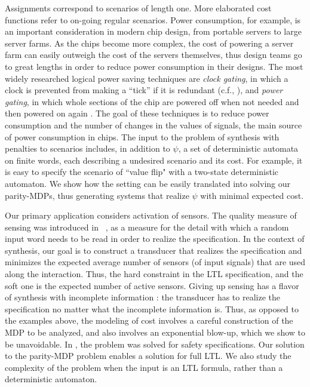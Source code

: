 \documentclass[runningheads,a4paper]{llncs}
\begin{document}
Assignments correspond to scenarios of length one. More elaborated cost functions refer to on-going regular scenarios. 
Power consumption, for example, is an important consideration in modern chip design, from portable servers
to large server farms. As the chips become more complex, the cost of powering a server
farm can easily outweigh the cost of the servers themselves, thus design teams go to great
lengths in order to reduce power consumption in their designs.
The most widely researched logical power saving techniques are \emph{clock gating}, in which a clock is prevented from making a ``tick'' if it is redundant (c.f., \cite{ARY09}), and \emph{power gating}, in which whole sections of the chip are powered off when not needed and then powered on again \cite{KFAGS07,ENY09}. The goal of these techniques is to reduce power consumption and the number of changes in the values of signals, the main source of power consumption in chips. 
The input to the problem of synthesis with penalties to scenarios includes, in addition to $\psi$, a set of deterministic automata on finite words, each describing a undesired scenario and its cost. For example, it is easy to specify the scenario of ``value flip" with a two-state deterministic automaton.
We show how the setting can be easily translated into solving our parity-MDPs, thus generating systems that realize $\psi$ with minimal expected cost. 


Our primary application considers activation of sensors. The quality measure of sensing was introduced in ~\cite{AKK14,AKK15}, as a measure for the detail with which a random input word needs to be read in order to realize the specification. In the context of synthesis, our goal is to construct a transducer that realizes the specification and minimizes the expected average number of sensors (of input signals) that are used along the interaction.
Thus, the hard constraint in the LTL specification, and the soft one is the expected number of active sensors. 
Giving up sensing has a flavor of synthesis with incomplete information \cite{KV00a}: the transducer has to realize the specification no matter what the incomplete information is. Thus, as opposed to the examples above, the modeling of cost involves a careful construction of the MDP to be analyzed, and also involves an exponential blow-up, which we show to be unavoidable.  In \cite{AKK15}, the problem was solved for safety specifications. Our solution to the parity-MDP problem enables a solution for full LTL. We also study the complexity of the problem when the input is an LTL formula, rather than a deterministic automaton. 
\end{document}
